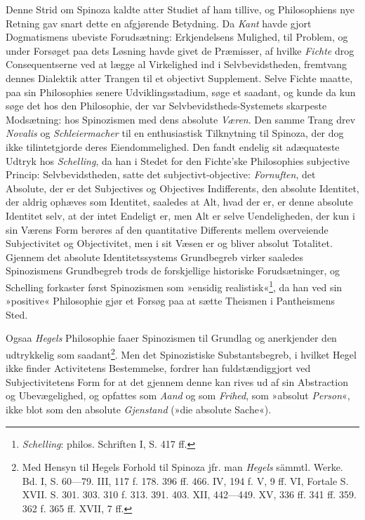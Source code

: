 \documentclass[12pt,a4paper]{book}
\newcommand{\opage}[1]{\marginnote{\footnotesize\textit{[#1]}}}
\begin{document}
Denne Strid om Spinoza kaldte atter Studiet af ham
tillive, og Philosophiens nye Retning gav snart dette en afgjørende
Betydning. Da \emph{Kant} havde gjort Dogmatismens
\opage{187} \setcounter{footnote}{0}%
ubeviste Forudsætning: Erkjendelsens Mulighed, til Problem,
og under Forsøget paa dets Løsning havde givet de Præmisser,
af hvilke \emph{Fichte} drog Consequentserne ved at lægge
al Virkelighed ind i Selvbevidstheden, fremtvang dennes
Dialektik atter Trangen til et objectivt Supplement. Selve
Fichte maatte, paa sin Philosophies senere Udviklingsstadium,
søge et saadant, og kunde da kun søge det hos den Philosophie,
der var Selvbevidstheds-Systemets skarpeste Modsætning:
hos Spinozismen med dens absolute \emph{Væren}. Den
samme Trang drev \emph{Novalis} og \emph{Schleiermacher} til en
enthusiastisk Tilknytning til Spinoza, der dog ikke tilintetgjorde
deres Eiendommelighed. Den fandt endelig sit adæquateste
Udtryk hos \emph{Schelling}, da han i Stedet for den
Fichte'ske Philosophies subjective Princip: Selvbevidstheden,
satte det subjectivt-objective: \emph{Fornuften}, det Absolute, der
er det Subjectives og Objectives Indifferents, den absolute
Identitet, der aldrig ophæves som Identitet, saaledes at
Alt, hvad der er, er denne absolute Identitet selv, at der
intet Endeligt er, men Alt er selve Uendeligheden, der kun
i sin Værens Form berøres af den quantitative Differents
mellem overveiende Subjectivitet og Objectivitet, men i sit
Væsen er og bliver absolut Totalitet. Gjennem det absolute
Identitetssystems Grundbegreb virker saaledes Spinozismens
Grundbegreb trods de forskjellige historiske Forudsætninger,
og Schelling forkaster først Spinozismen som »ensidig
realistisk«\footnote{\emph{Schelling}: philos. Schriften I, S. 417 ff.}, da han ved sin »positive« Philosophie gjør et
Forsøg paa at sætte Theismen i Pantheismens Sted.

Ogsaa \emph{Hegels} Philosophie faaer Spinozismen til Grundlag
og anerkjender den udtrykkelig som saadant\footnote{Med Hensyn til Hegels Forhold til Spinoza jfr. man \emph{Hegels}
sämmtl. Werke. Bd. I, S. 60---79. III, 117 f. 178. 396 ff. 466.
IV, 194 f. V, 9 ff. VI, Fortale S. XVII. S. 301. 303. 310 f.
313. 391. 403. XII, 442---449. XV, 336 ff. 341 ff. 359. 362 f.
365 ff. XVII, 7 ff.}. Men
det Spinozistiske Substantsbegreb, i hvilket Hegel ikke finder
\opage{188} \setcounter{footnote}{0}%
Activitetens Bestemmelse, fordrer han fuldstændiggjort ved
Subjectivitetens Form for at det gjennem denne kan rives ud
af sin Abstraction og Ubevægelighed, og opfattes som \emph{Aand}
og som \emph{Frihed}, som »absolut \emph{Person}«, ikke blot som
den absolute \emph{Gjenstand} (»die absolute Sache«).
\end{document}
